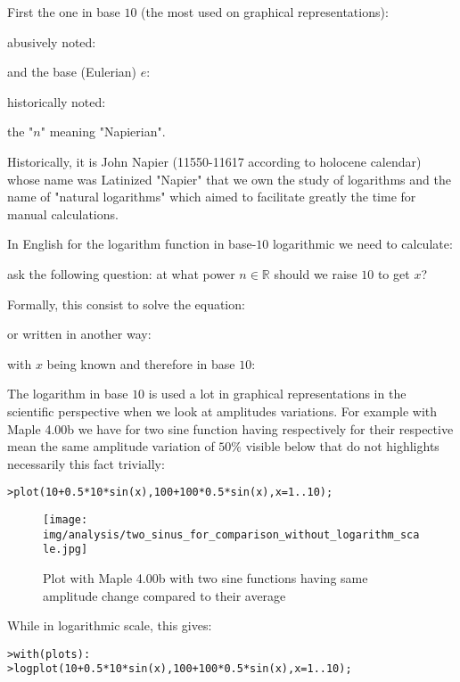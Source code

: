 	First the one in base $10$ (the most used on graphical representations):
	
	abusively noted:
	
	and the base (Eulerian) $e$:
	
	historically noted:
	
	the "$n$" meaning "Napierian".
	
	\begin{tcolorbox}[title=Remark,arc=10pt,breakable,drop lifted shadow,
  skin=enhanced,
  skin first is subskin of={enhancedfirst}{arc=10pt,no shadow},
  skin middle is subskin of={enhancedmiddle}{arc=10pt,no shadow},
  skin last is subskin of={enhancedlast}{drop lifted shadow}]
	Historically, it is John Napier (11550-11617 according to holocene calendar) whose name was Latinized "Napier" that we own the study of logarithms and the name of "natural logarithms" which aimed to facilitate greatly the time for manual calculations.
	\end{tcolorbox}
	In English for the logarithm function in base-$10$ logarithmic we need to calculate:
	
	ask the following question: at what power $n\in \mathbb{R}$ should we raise $10$ to get $x$?
	
	Formally, this consist to solve the equation:
	
	or written in another way:
	
	with $x$ being known and therefore in base $10$:
	
	The logarithm in base $10$ is used a lot in graphical representations in the scientific perspective when we look at amplitudes variations. For example with Maple 4.00b we have for two sine function having respectively for their respective mean the same amplitude variation of $50\%$ visible below that do not highlights necessarily this fact trivially:
	
	\texttt{>plot({10+0.5*10*sin(x),100+100*0.5*sin(x)},x=1..10);}
	
	\begin{figure}[H]
		\centering
		\texttt{[image: img/analysis/two\_sinus\_for\_comparison\_without\_logarithm\_scale.jpg]}
		\caption[]{Plot with Maple 4.00b with two sine functions having same\\ amplitude change compared to their average}
	\end{figure}
	While in logarithmic scale, this gives:
	
	\texttt{>with(plots):\\
	>logplot({10+0.5*10*sin(x),100+100*0.5*sin(x)},x=1..10);}
	
